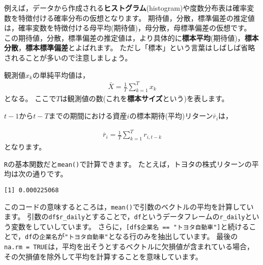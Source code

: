 \documentclass[
  letterpaper,
  pandoc,
  ja=standard,
  jafont = hiragino-pron]{ltjsbook}
\newenvironment{Shaded}{\begin{snugshade}}{\end{snugshade}}
\newcommand{\AttributeTok}[1]{\textcolor[rgb]{0.40,0.45,0.13}{#1}}
\newcommand{\ConstantTok}[1]{\textcolor[rgb]{0.56,0.35,0.01}{#1}}
\newcommand{\FunctionTok}[1]{\textcolor[rgb]{0.28,0.35,0.67}{#1}}
\newcommand{\NormalTok}[1]{\textcolor[rgb]{0.00,0.23,0.31}{#1}}
\newcommand{\SpecialCharTok}[1]{\textcolor[rgb]{0.37,0.37,0.37}{#1}}
\newcommand{\StringTok}[1]{\textcolor[rgb]{0.13,0.47,0.30}{#1}}
\begin{document}
例えば，データから作成される\textbf{ヒストグラム}(histogram)や度数分布表は確率変数を特徴付ける確率分布の仮想となります。
期待値，分散，標準偏差の推定値は，確率変数を特徴付ける母平均(期待値)，母分散，母標準偏差の仮想です。
この期待値，分散，標準偏差の推定値は，より具体的に\textbf{標本平均}(期待値)，\textbf{標本分散}，\textbf{標本標準偏差}とよばれます。
ただし「標本」という言葉はしばしば省略されることが多いので注意しましょう。

\begin{tcolorbox}[enhanced jigsaw, colframe=quarto-callout-important-color-frame, breakable, rightrule=.15mm, coltitle=black, title=\textcolor{quarto-callout-important-color}{\faExclamation}\hspace{0.5em}{(標本)単純平均}, colbacktitle=quarto-callout-important-color!10!white, leftrule=.75mm, colback=white, left=2mm, arc=.35mm, opacityback=0, titlerule=0mm, toptitle=1mm, bottomtitle=1mm, bottomrule=.15mm, toprule=.15mm, opacitybacktitle=0.6]

観測値\(x_k\)の単純平均値は， \[
\begin{aligned}
\bar X = \frac 1T \sum_{k=1}^T x_k
\end{aligned}
\] となる。
ここで\(T\)は観測値の数(これを\textbf{標本サイズ}という)を表します。

\end{tcolorbox}

\(t-1\)から\(t-T\)までの期間における資産\(i\)の標本期待(平均)リターン\(\bar r_i\)は，

\[
\begin{aligned}
\bar r_i = \frac 1T \sum _{k=1}^T r_{i,t-k}
\end{aligned}
\] となります。

\texttt{R}の基本関数だと\texttt{mean()}で計算できます。
たとえば，トヨタの株式リターンの平均は次の通りです。

\begin{Shaded}
\end{Shaded}

\begin{verbatim}
[1] 0.000225068
\end{verbatim}

このコードの意味するところは，\texttt{mean()}で引数のベクトルの平均を計算しています。
引数の\texttt{df\$r\_daily}とすることで，\texttt{df}というデータフレームの\texttt{r\_daily}という変数をしていしています。
さらに，\texttt{{[}df\$企業名\ ==\ "トヨタ自動車"{]}}と続けることで，\texttt{df}の\texttt{企業名}が\texttt{"トヨタ自動車"}となる行のみを抽出しています。
最後の\texttt{na.rm\ =\ TRUE}は，平均を出そうとするベクトルに欠損値が含まれている場合，その欠損値を除外して平均を計算することを意味しています。
\end{document}
